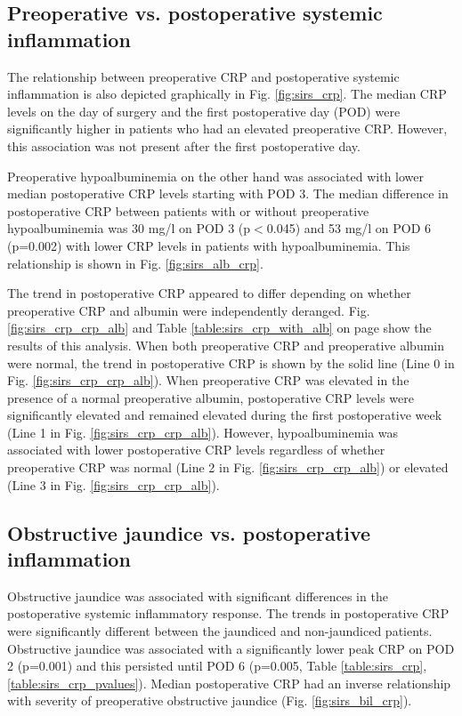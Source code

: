 \subsection{Preoperative vs. postoperative systemic inflammation}
The relationship between preoperative CRP and postoperative systemic inflammation is also depicted graphically in Fig. \ref{fig:sirs_crp}. 
The median CRP levels on the day of surgery and the first postoperative day (POD) were significantly higher in patients who had an elevated preoperative CRP. 
However, this association was not present after the first postoperative day.

Preoperative hypoalbuminemia on the other hand was associated with lower median postoperative CRP levels starting with POD 3. 
The median difference in postoperative CRP between patients with or without preoperative hypoalbuminemia was 30 mg/l on POD 3 (p$<$0.045) and 53 mg/l on POD 6 (p=0.002) with lower CRP levels in patients with hypoalbuminemia.
This relationship is shown in Fig. \ref{fig:sirs_alb_crp}.

The trend in postoperative CRP appeared to differ depending on whether preoperative CRP and albumin were independently deranged.
Fig. \ref{fig:sirs_crp_crp_alb} and Table \ref{table:sirs_crp_with_alb} on page \pageref{fig:sirs_crp_crp_alb} show the results of this analysis.
When both preoperative CRP and preoperative albumin were normal, the trend in postoperative CRP is shown by the solid line (Line 0 in Fig. \ref{fig:sirs_crp_crp_alb}). 
When preoperative CRP was elevated in the presence of a normal preoperative albumin, postoperative CRP levels were significantly elevated and remained elevated during the first postoperative week (Line 1 in Fig. \ref{fig:sirs_crp_crp_alb}). 
However, hypoalbuminemia was associated with lower postoperative CRP levels regardless of whether preoperative CRP was normal (Line 2 in Fig. \ref{fig:sirs_crp_crp_alb}) or elevated (Line 3 in Fig. \ref{fig:sirs_crp_crp_alb}). 

\subsection{Obstructive jaundice vs. postoperative inflammation}
Obstructive jaundice was associated with significant differences in the postoperative systemic inflammatory response. 
The trends in postoperative CRP were significantly different between the jaundiced and non-jaundiced patients. 
Obstructive jaundice was associated with a significantly lower peak CRP on POD 2 (p=0.001) and this persisted until POD 6 (p=0.005, Table \ref{table:sirs_crp}, \ref{table:sirs_crp_pvalues}).
Median postoperative CRP had an inverse relationship with severity of preoperative obstructive jaundice (Fig. \ref{fig:sirs_bil_crp}).

